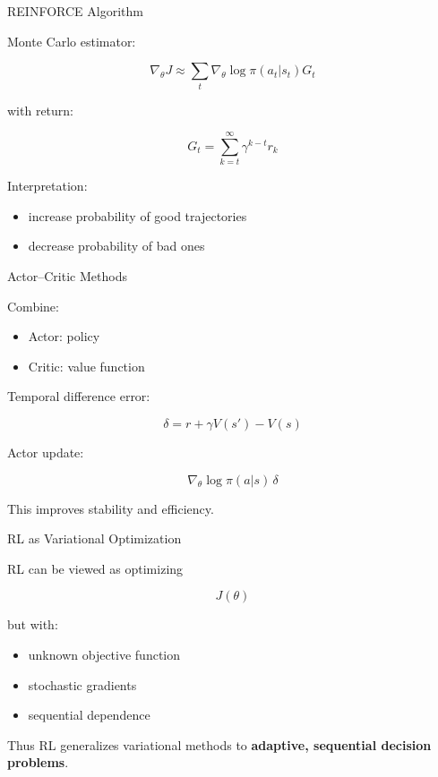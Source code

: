 \documentclass{beamer}
\begin{document}
\begin{frame}{REINFORCE Algorithm}

Monte Carlo estimator:

\[
\nabla_\theta J \approx
\sum_t \nabla_\theta \log \pi(a_t|s_t) G_t
\]

with return:

\[
G_t = \sum_{k=t}^\infty \gamma^{k-t} r_k
\]

Interpretation:

\begin{itemize}
\item increase probability of good trajectories
\item decrease probability of bad ones
\end{itemize}

\end{frame}

\begin{frame}{Actor--Critic Methods}

Combine:

\begin{itemize}
\item Actor: policy
\item Critic: value function
\end{itemize}

Temporal difference error:

\[
\delta = r + \gamma V(s') - V(s)
\]

Actor update:

\[
\nabla_\theta \log \pi(a|s)\,\delta
\]

This improves stability and efficiency.

\end{frame}

\begin{frame}{RL as Variational Optimization}

RL can be viewed as optimizing

\[
J(\theta)
\]

but with:

\begin{itemize}
\item unknown objective function
\item stochastic gradients
\item sequential dependence
\end{itemize}

Thus RL generalizes variational methods to
\textbf{adaptive, sequential decision problems}.

\end{frame}
\end{document}
